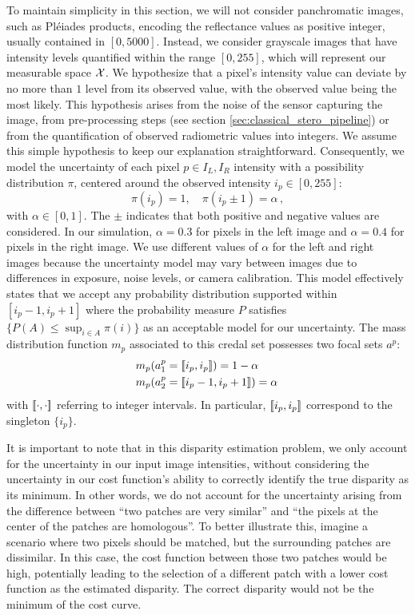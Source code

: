 To maintain simplicity in this section, we will not consider panchromatic images, such as Pléiades products, encoding the reflectance values as positive integer, usually contained in $[0, 5000]$. Instead, we consider grayscale images that have intensity levels quantified within the range $[0, 255]$, which will represent our measurable space ${\mathcal{X}}$. We hypothesize that a pixel's intensity value can deviate by no more than $1$ level from its observed value, with the observed value being the most likely. This hypothesis arises from the noise of the sensor capturing the image, from pre-processing steps (see section \ref{sec:classical_stero_pipeline}) or from the quantification of observed radiometric values into integers. We assume this simple hypothesis to keep our explanation straightforward. Consequently, we model the uncertainty of each pixel $p\in I_L,I_R$ intensity with a possibility distribution $\pi$, centered around the observed intensity $i_p\in[0,255]$:
\begin{equation}
    \pi(i_p)=1,\quad \pi(i_p\pm1)=\alpha\,,
\end{equation}\label{eq:pixel_possibility}
with $\alpha \in [0,1]$. The $\pm$ indicates that both positive and negative values are considered. In our simulation, $\alpha = 0.3$ for pixels in the left image and $\alpha = 0.4$ for pixels in the right image. We use different values of $\alpha$ for the left and right images because the uncertainty model may vary between images due to differences in exposure, noise levels, or camera calibration. This model effectively states that we accept any probability distribution supported within $[i_p - 1, i_p + 1]$ where the probability measure $P$ satisfies $\{P(A) \leq \sup_{i \in A} \pi(i)\}$ as an acceptable model for our uncertainty. The mass distribution function $m_p$ associated to this credal set possesses two focal sets $a^p$:
\begin{eqnarray}
    &m_p(a^p_1={[\![} i_p, i_p{]\!]})=1-\alpha\,\nonumber\\
    &m_p(a^p_2={[\![} i_p-1, i_p + 1{]\!]})=\alpha\,\label{eq:pixel_mass}
\end{eqnarray}
with ${[\![}\cdot, \cdot{]\!]}$ referring to integer intervals. In particular, ${[\![} i_p, i_p{]\!]}$ correspond to the singleton $\{i_p\}$.

It is important to note that in this disparity estimation problem, we only account for the uncertainty in our input image intensities, without considering the uncertainty in our cost function's ability to correctly identify the true disparity as its minimum. In other words, we do not account for the uncertainty arising from the difference between ``two patches are very similar'' and ``the pixels at the center of the patches are homologous''. To better illustrate this, imagine a scenario where two pixels should be matched, but the surrounding patches are dissimilar. In this case, the cost function between those two patches would be high, potentially leading to the selection of a different patch with a lower cost function as the estimated disparity. The correct disparity would not be the minimum of the cost curve.


